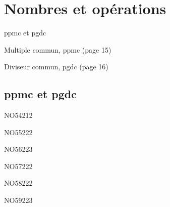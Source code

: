 \documentclass[a4paper,11pt]{report}
\begin{document}
\newcommand{\chapterName}{Nombres et opérations}
\newcommand{\serieName}{ppmc et pgdc}


\chapter*{\chapterName}
\thispagestyle{empty}

\begin{amL}{\serieName}{
\item Multiple commun, ppmc (page 15)
\item Diviseur commun, pgdc (page 16)

}
\end{amL}

\section*{\serieName}
\setcounter{page}{1}
\thispagestyle{firstPage}




\begin{exol}{NO54}{21}{2}
\end{exol}
\begin{exol}{NO55}{22}{2}
\end{exol}
\begin{exol}{NO56}{22}{3}
\end{exol}
\begin{exol}{NO57}{22}{2}
\end{exol}
\begin{exol}{NO58}{22}{2}
\end{exol}
\begin{exol}{NO59}{22}{3}
\end{exol}


\end{document}

